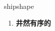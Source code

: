 
\begin{frame}
{\huge shipshape}
\begin{center}
\begin{enumerate}\Large
  \item \textbf{井然有序的}
\end{enumerate}
\end{center}
\end{frame}
